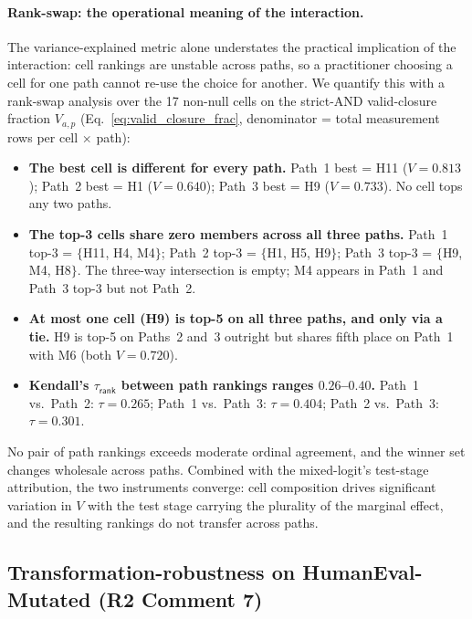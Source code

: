 \paragraph{Rank-swap: the operational meaning of the interaction.} The variance-explained metric alone understates the practical implication of the interaction: cell rankings are unstable across paths, so a practitioner choosing a cell for one path cannot re-use the choice for another. We quantify this with a rank-swap analysis over the 17 non-null cells on the strict-AND valid-closure fraction $V_{a, p}$ (Eq.~\ref{eq:valid_closure_frac}, denominator = total measurement rows per cell $\times$ path):

\begin{itemize}
  \item \textbf{The best cell is different for every path.} Path~1 best = H11 ($V = 0.813$); Path~2 best = H1 ($V = 0.640$); Path~3 best = H9 ($V = 0.733$). No cell tops any two paths.
  \item \textbf{The top-3 cells share zero members across all three paths.} Path~1 top-3 = $\{$H11, H4, M4$\}$; Path~2 top-3 = $\{$H1, H5, H9$\}$; Path~3 top-3 = $\{$H9, M4, H8$\}$. The three-way intersection is empty; M4 appears in Path~1 and Path~3 top-3 but not Path~2.
  \item \textbf{At most one cell (H9) is top-5 on all three paths, and only via a tie.} H9 is top-5 on Paths~2 and~3 outright but shares fifth place on Path~1 with M6 (both $V = 0.720$).
  \item \textbf{Kendall's $\tau_{\textsf{rank}}$ between path rankings ranges $0.26$--$0.40$.} Path~1 vs.\ Path~2: $\tau = 0.265$; Path~1 vs.\ Path~3: $\tau = 0.404$; Path~2 vs.\ Path~3: $\tau = 0.301$.
\end{itemize}

No pair of path rankings exceeds moderate ordinal agreement, and the winner set changes wholesale across paths. Combined with the mixed-logit's test-stage attribution, the two instruments converge: cell composition drives significant variation in $V$ with the test stage carrying the plurality of the marginal effect, and the resulting rankings do not transfer across paths.

\subsection{Transformation-robustness on HumanEval-Mutated (R2 Comment 7)}
\label{sec:results_contamination}



